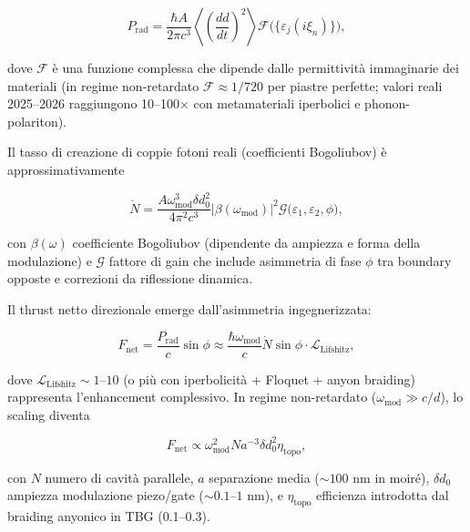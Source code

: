 \documentclass[11pt,a4paper]{article}
\theoremstyle{plain}
\theoremstyle{definition}
\begin{document}
\begin{equation}
P_{\mathrm{rad}} = \frac{\hbar A}{2\pi c^3} \left\langle \left( \frac{dd}{dt} \right)^2 \right\rangle \mathcal{F}\bigl(\{\varepsilon_j(i\xi_n)\}\bigr),
\label{eq:dce-power-deriv}
\end{equation}

dove $\mathcal{F}$ è una funzione complessa che dipende dalle permittività immaginarie dei materiali (in regime non-retardato $\mathcal{F} \approx 1/720$ per piastre perfette; valori reali 2025–2026 raggiungono 10–100× con metamateriali iperbolici e phonon-polariton).

Il tasso di creazione di coppie fotoni reali (coefficienti Bogoliubov) è approssimativamente

\begin{equation}
\dot{N} = \frac{A \omega_{\mathrm{mod}}^3 \delta d_0^2}{4\pi^2 c^3} \left| \beta(\omega_{\mathrm{mod}}) \right|^2 \mathcal{G}\bigl(\varepsilon_1, \varepsilon_2, \phi\bigr),
\label{eq:bogoliubov-rate}
\end{equation}

con $\beta(\omega)$ coefficiente Bogoliubov (dipendente da ampiezza e forma della modulazione) e $\mathcal{G}$ fattore di gain che include asimmetria di fase $\phi$ tra boundary opposte e correzioni da riflessione dinamica.

Il thrust netto direzionale emerge dall'asimmetria ingegnerizzata:

\begin{equation}
F_{\mathrm{net}} = \frac{P_{\mathrm{rad}}}{c} \sin\phi \approx \frac{\hbar \omega_{\mathrm{mod}}}{c} \dot{N} \sin\phi \cdot \mathcal{L}_{\mathrm{Lifshitz}},
\label{eq:thrust-lifshitz}
\end{equation}

dove $\mathcal{L}_{\mathrm{Lifshitz}} \sim 1$--$10$ (o più con iperbolicità + Floquet + anyon braiding) rappresenta l'enhancement complessivo. In regime non-retardato ($\omega_{\mathrm{mod}} \gg c/d$), lo scaling diventa

\begin{equation}
F_{\mathrm{net}} \propto \omega_{\mathrm{mod}}^2 N a^{-3} \delta d_0^2 \eta_{\mathrm{topo}},
\label{eq:lifshitz-scaling}
\end{equation}

con $N$ numero di cavità parallele, $a$ separazione media ($\sim 100$ nm in moiré), $\delta d_0$ ampiezza modulazione piezo/gate ($\sim 0.1$--$1$ nm), e $\eta_{\mathrm{topo}}$ efficienza introdotta dal braiding anyonico in TBG (0.1--0.3).
\end{document}
